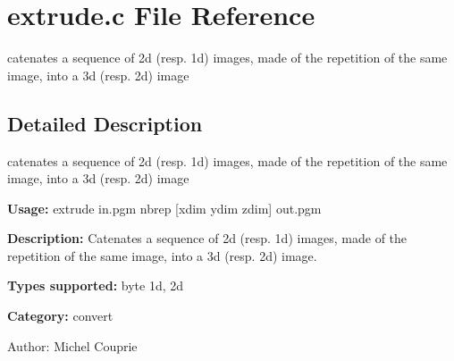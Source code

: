 \section{extrude.c File Reference}
\label{extrude_8c}
catenates a sequence of 2d (resp. 1d) images, made of the repetition of the same image, into a 3d (resp. 2d) image  




\label{_details}
\subsection{Detailed Description}
catenates a sequence of 2d (resp. 1d) images, made of the repetition of the same image, into a 3d (resp. 2d) image 

{\bf Usage:} extrude in.pgm nbrep [xdim ydim zdim] out.pgm

{\bf Description:} Catenates a sequence of 2d (resp. 1d) images, made of the repetition of the same image, into a 3d (resp. 2d) image.

{\bf Types supported:} byte 1d, 2d

{\bf Category:} convert

\begin{Desc}
\item[Author:]Michel Couprie \end{Desc}
